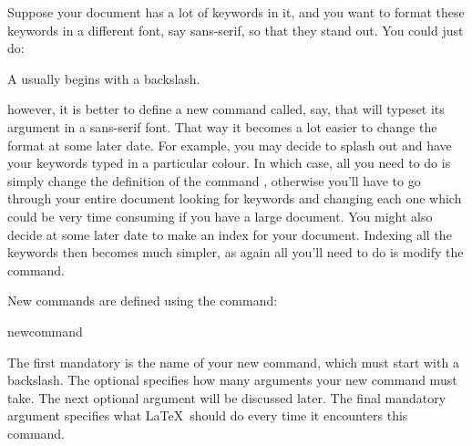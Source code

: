 \begin{enumerate}
\label{example:keywords}%
Suppose your document has a lot of keywords
in it, and you want to format these keywords in a different font,
say sans-serif, so that they stand out.  You could just
do:
\begin{codeS}
A  usually begins with a backslash.
\end{codeS}%
however, it is better to define a new command called, say,
 that will typeset its argument in a
sans-serif font.  That way it becomes a lot easier
to change the format at some later date.  For example,
you may decide to splash out and have your keywords
typed in a particular colour.  In which case, all you
need to do is simply change the definition of the
command , otherwise you'll have to 
go through your entire document looking for keywords
and changing each one which could be very time consuming if
you have a large document.  You might also decide at some
later date to make an index for your document.  Indexing
all the keywords then becomes much simpler, as again all you'll
need to do is modify the  command.

\end{enumerate}

New commands are defined using the command:
\begin{definition}
\gls{newcommand}
\end{definition}%
The first \gls{mandatory}  is
the name of your new command, which must start with a backslash.
The \gls{optional}  specifies
how many arguments your new command must take.  The next
optional argument  will be discussed later.
The final mandatory argument  specifies what \LaTeX\ 
should do every time it encounters this command.


